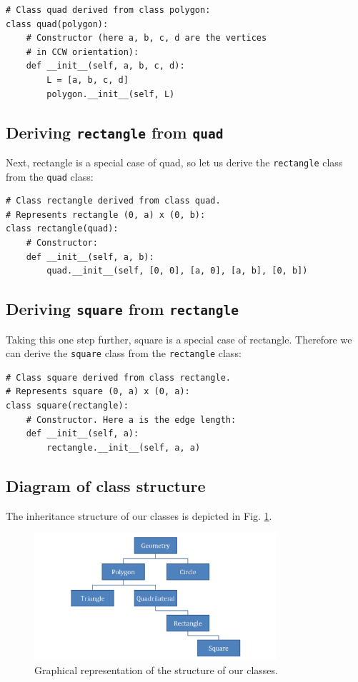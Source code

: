 \begin{verbatim}
# Class quad derived from class polygon:
class quad(polygon):
    # Constructor (here a, b, c, d are the vertices
    # in CCW orientation):
    def __init__(self, a, b, c, d):
        L = [a, b, c, d]
        polygon.__init__(self, L)
\end{verbatim}

\subsection{Deriving {\tt rectangle} from {\tt quad}}

Next, rectangle is a special case of quad, so let us derive the 
{\tt rectangle} class from the {\tt quad} class:

\begin{verbatim}
# Class rectangle derived from class quad.
# Represents rectangle (0, a) x (0, b):
class rectangle(quad):
    # Constructor:
    def __init__(self, a, b):
        quad.__init__(self, [0, 0], [a, 0], [a, b], [0, b])
\end{verbatim}

\subsection{Deriving {\tt square} from {\tt rectangle}}

Taking this one step further, square is a special case of rectangle. Therefore 
we can derive the {\tt square} class from the {\tt rectangle} class:

\begin{verbatim}
# Class square derived from class rectangle.
# Represents square (0, a) x (0, a):
class square(rectangle):
    # Constructor. Here a is the edge length:
    def __init__(self, a):
        rectangle.__init__(self, a, a)
\end{verbatim}

\subsection{Diagram of class structure}

The inheritance structure of our classes is depicted in Fig. \ref{fig:classes}.

\begin{figure}[!ht]
\begin{center}
\includegraphics[width=0.8\textwidth]{imgp/classes.png}
\end{center}
\vspace{-2mm}
\caption{Graphical representation of the structure of our classes.}
\label{fig:classes}
\end{figure}

